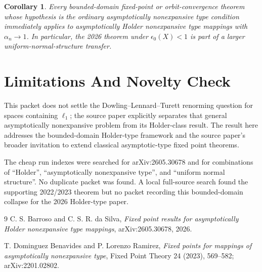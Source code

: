 \documentclass[11pt]{article}
\newtheorem{corollary}{Corollary}
\begin{document}
\begin{corollary}
Every bounded-domain fixed-point or orbit-convergence theorem whose hypothesis
is the ordinary asymptotically nonexpansive type condition immediately applies
to asymptotically Holder nonexpansive type mappings with \(\alpha_n\to 1\).
In particular, the 2026 theorem under \(\epsilon_0(X)<1\) is part of a larger
uniform-normal-structure transfer.
\end{corollary}

\section*{Limitations And Novelty Check}

This packet does not settle the Dowling--Lennard--Turett renorming question
for spaces containing \(\ell_1\); the source paper explicitly separates that
general asymptotically nonexpansive problem from its Holder-class result.
The result here addresses the bounded-domain Holder-type framework and the
source paper's broader invitation to extend classical asymptotic-type fixed
point theorems.

The cheap run indexes were searched for arXiv:2605.30678 and for combinations
of ``Holder'', ``asymptotically nonexpansive type'', and ``uniform normal
structure''.  No duplicate packet was found.  A local full-source search found
the supporting 2022/2023 theorem but no packet recording this bounded-domain
collapse for the 2026 Holder-type paper.

\begin{thebibliography}{9}
C. S. Barroso and C. S. R. da Silva,
\emph{Fixed point results for asymptotically Holder nonexpansive type
mappings}, arXiv:2605.30678, 2026.

T. Dominguez Benavides and P. Lorenzo Ramirez,
\emph{Fixed points for mappings of asymptotically nonexpansive type},
Fixed Point Theory 24 (2023), 569--582; arXiv:2201.02802.
\end{thebibliography}
\end{document}
